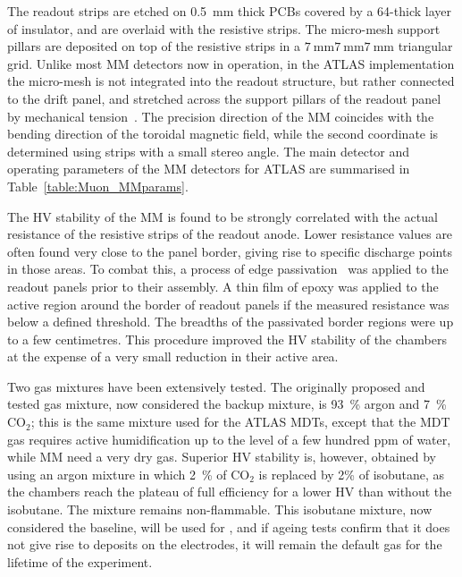 \documentclass[cernpreprint, atlasdraft=false, UKenglish,british,orcidlogo, texmf, orcidlogo]{atlasdoc}
\begin{document}
The readout strips are etched on \SI{0.5}{\mm} thick \glspl{PCB} covered by a \SI{64}{\micron}-thick layer of insulator, and are overlaid with the resistive strips.
The micro-mesh support pillars are deposited on top of the resistive strips in a $\SI{7}{\mm}\SI{7}{\mm}\SI{7}{\mm}$ triangular grid.
Unlike most \gls{MM} detectors now in operation, in the ATLAS implementation the micro-mesh is not integrated into the readout structure, but rather connected to the drift panel, and stretched across the support pillars of the readout panel by mechanical tension~\cite{Farina_LaRochelle,ALLARD2022166143,AGARWALA2022167285}.
The precision direction of the \gls{MM} coincides with the bending direction of the toroidal magnetic field, while the second coordinate is determined using strips with a small stereo angle.
The main detector and operating parameters of the \gls{MM} detectors for ATLAS are summarised in Table~\ref{table:Muon_MMparams}.
 
The \gls{HV} stability of the \gls{MM} is found to be strongly correlated with the actual resistance of the resistive strips of the readout anode.
Lower resistance values are often found very close to the panel border, giving rise to specific discharge points in those areas.
To combat this, a process of edge passivation~\cite{INST20_MM,ALLARD2022166143,AGARWALA2022167285} was applied to the readout panels prior to their assembly.
A thin film of epoxy was applied
to the active region around the border of readout panels if the measured resistance was below a defined threshold. The breadths of the passivated border regions were up to a few centimetres.
This procedure improved the \gls{HV} stability of the chambers at the expense of a very small reduction in their active area. 
 
Two gas mixtures have been extensively tested.
The originally proposed and tested gas mixture, now considered the backup mixture, is \SI{93}{\percent} argon and \SI{7}{\percent} CO$_2$; this is the same mixture used for the ATLAS \glspl{MDT}, except that the \gls{MDT} gas requires active humidification up to the level of a few hundred ppm of water, while \gls{MM} need a very dry gas.
Superior \gls{HV} stability is, however, obtained by using an argon mixture in which \SI{2}{\percent} of CO$_2$ is replaced by 2\% of
isobutane, as the chambers reach the plateau of full efficiency for a lower \gls{HV} than without the isobutane. The mixture remains non-flammable.
This isobutane mixture, now considered the baseline, will be used for \RunThr, and if ageing tests confirm that it does not give rise to deposits on the electrodes, it will remain the default gas for the lifetime of the experiment.
 
\end{document}

